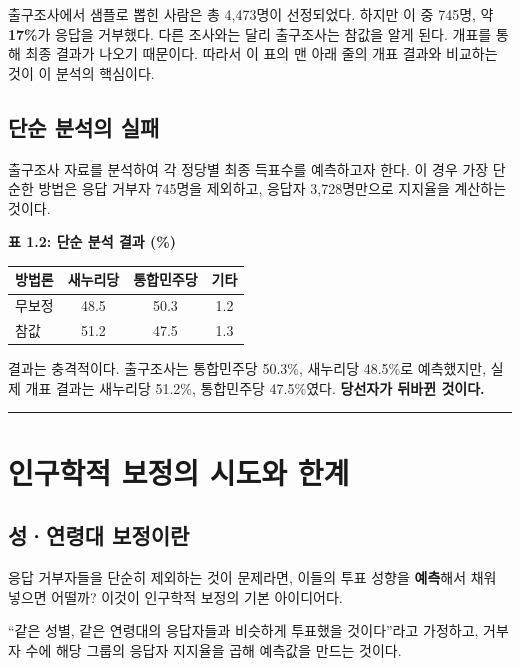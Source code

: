\documentclass[
  letterpaper,
  DIV=11,
  numbers=noendperiod]{scrreprt}
\newcounter{none} %
\begin{document}
출구조사에서 샘플로 뽑힌 사람은 총 4,473명이 선정되었다. 하지만 이 중
745명, 약 \textbf{17\%}가 응답을 거부했다. 다른 조사와는 달리 출구조사는
참값을 알게 된다. 개표를 통해 최종 결과가 나오기 때문이다. 따라서 이
표의 맨 아래 줄의 개표 결과와 비교하는 것이 이 분석의 핵심이다.

\subsection{단순 분석의
실패}\label{uxb2e8uxc21c-uxbd84uxc11duxc758-uxc2e4uxd328}

출구조사 자료를 분석하여 각 정당별 최종 득표수를 예측하고자 한다. 이
경우 가장 단순한 방법은 응답 거부자 745명을 제외하고, 응답자
3,728명만으로 지지율을 계산하는 것이다.

\textbf{표 1.2: 단순 분석 결과 (\%)}

{\def\LTcaptype{none} %
\begin{longtable}[]{@{}lccc@{}}
\toprule\noalign{}
방법론 & 새누리당 & 통합민주당 & 기타 \\
\midrule\noalign{}
\endhead
\bottomrule\noalign{}
\endlastfoot
무보정 & 48.5 & 50.3 & 1.2 \\
참값 & 51.2 & 47.5 & 1.3 \\
\end{longtable}
}

결과는 충격적이다. 출구조사는 통합민주당 50.3\%, 새누리당 48.5\%로
예측했지만, 실제 개표 결과는 새누리당 51.2\%, 통합민주당 47.5\%였다.
\textbf{당선자가 뒤바뀐 것이다.}

\begin{center}\rule{0.5\linewidth}{0.5pt}\end{center}

\section{인구학적 보정의 시도와
한계}\label{uxc778uxad6cuxd559uxc801-uxbcf4uxc815uxc758-uxc2dcuxb3c4uxc640-uxd55cuxacc4}

\subsection{성·연령대
보정이란}\label{uxc131uxc5f0uxb839uxb300-uxbcf4uxc815uxc774uxb780}

응답 거부자들을 단순히 제외하는 것이 문제라면, 이들의 투표 성향을
\textbf{예측}해서 채워 넣으면 어떨까? 이것이 인구학적 보정의 기본
아이디어다.

``같은 성별, 같은 연령대의 응답자들과 비슷하게 투표했을 것이다''라고
가정하고, 거부자 수에 해당 그룹의 응답자 지지율을 곱해 예측값을 만드는
것이다.
\end{document}
